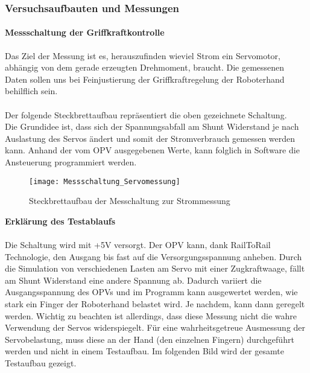 \documentclass[titlepage,12pt,twoside]{article}
\begin{document}
\subsubsection{Versuchsaufbauten und Messungen}
\paragraph{Messschaltung der Griffkraftkontrolle}
\hfill \break
\hfill \break
Das Ziel der Messung ist es, herauszufinden wieviel Strom ein Servomotor, abhängig von dem gerade erzeugten Drehmoment, 
braucht. Die gemessenen Daten sollen uns bei Feinjustierung der Griffkraftregelung der Roboterhand behilflich sein. \\
\\
Der folgende Steckbrettaufbau repräsentiert die oben gezeichnete Schaltung. \\
Die Grundidee ist, dass sich der Spannungsabfall am Shunt Widerstand je nach Auslastung des Servos ändert und somit der 
Stromverbrauch gemessen werden kann. Anhand der vom OPV ausgegebenen Werte, kann folglich in Software die Ansteuerung programmiert 
werden. \\
\begin{figure}[H]
	\begin{center}
		\scalebox{0.8}
		{\texttt{[image: Messschaltung\_Servomessung]}}
		\caption{Steckbrettaufbau der Messchaltung zur Strommessung}
		\label{fig:Messschaltung_Servomessung}		
	\end{center}
\end{figure}
\hfill \break
\hfill \break
\hfill \break
\textbf{Erklärung des Testablaufs} \\
\\
Die Schaltung wird mit +5V versorgt. Der OPV  kann, dank RailToRail Technologie, den Ausgang bis fast auf die 
Versorgungsspannung anheben. Durch die Simulation von verschiedenen Lasten am Servo mit einer Zugkraftwaage, fällt am Shunt 
Widerstand eine andere Spannung ab. Dadurch variiert die Ausgangsspannung des OPVs und im Programm kann ausgewertet werden, 
wie stark ein Finger der Roboterhand belastet wird. Je nachdem, kann dann geregelt werden. 
Wichtig zu beachten ist allerdings, dass diese Messung nicht die wahre Verwendung der Servos widerspiegelt. Für eine 
wahrheitsgetreue Ausmessung der Servobelastung, muss diese an der Hand (den einzelnen Fingern) durchgeführt werden und nicht 
in einem Testaufbau. Im folgenden Bild wird der gesamte Testaufbau gezeigt. \\
\end{document}
